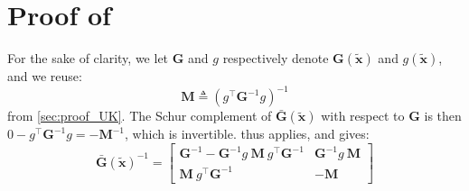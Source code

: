 \section[Proof of Proposition 3.11]{Proof of }\label{sec:proof_block_kriging}

For the sake of clarity, we let $\mathbf{G}$ and $g$ respectively denote $\mathbf{G}(\tilde{\mathbf{x}})$ and $g(\tilde{\mathbf{x}})$, and we reuse:
\begin{equation}
	\mathbf{M}\triangleq\left(g^\top \mathbf{G}^{-1}g\right)^{-1}
\end{equation}
from \cref{sec:proof_UK}. The Schur complement of $\bar{\mathbf{G}}(\tilde{\mathbf{x}})$ with respect to $\mathbf{G}$ is then $0-g^\top \mathbf{G}^{-1}g=-\mathbf{M}^{-1}$, which is invertible.  thus applies, and gives:
\begin{equation}
	\bar{\mathbf{G}}(\tilde{\mathbf{x}})^{-1}=\begin{bmatrix}\mathbf{G}^{-1}-\mathbf{G}^{-1}g\:\mathbf{M}\:g^\top \mathbf{G}^{-1}&\mathbf{G}^{-1}g\:\mathbf{M}\\\mathbf{M}\:g^\top \mathbf{G}^{-1}&-\mathbf{M}\end{bmatrix}
\end{equation}

